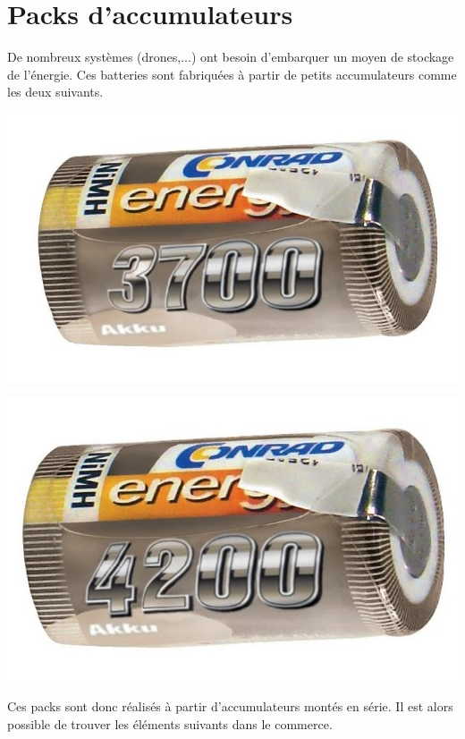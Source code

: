 

\section{Packs d'accumulateurs}
 
De nombreux systèmes (drones,...) ont besoin d'embarquer un moyen de stockage de l'énergie. Ces batteries sont fabriquées à partir de petits accumulateurs comme les deux suivants.

\begin{minipage}{0.45\linewidth}
\centering \includegraphics[width=0.6\linewidth]{img/3700}
\end{minipage}\hfill
\begin{minipage}{0.45\linewidth}
\centering \includegraphics[width=0.6\linewidth]{img/4200}
\end{minipage}

Ces packs sont donc réalisés à partir d'accumulateurs montés en série. Il est alors possible de trouver les éléments suivants dans le commerce.

